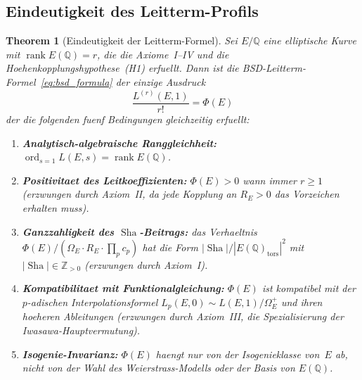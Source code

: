 \documentclass[aps,prd,twocolumn,superscriptaddress,nofootinbib]{revtex4-2}
\newtheorem{theorem}{Theorem}[section]
\theoremstyle{definition}
\theoremstyle{remark}
\DeclareMathOperator{\ord}{ord}
\DeclareMathOperator{\rank}{rank}
\DeclareMathOperator{\Sha}{Sha}
\begin{document}
\subsection{Eindeutigkeit des Leitterm-Profils}

\begin{theorem}[Eindeutigkeit der Leitterm-Formel]
\label{thm:uniqueness}
Sei $E/\mathbb{Q}$ eine elliptische Kurve mit $\rank E(\mathbb{Q}) = r$, die die Axiome~I--IV und die Hoehenkopplungshypothese~(H1) erfuellt. Dann ist die BSD-Leitterm-Formel~\eqref{eq:bsd_formula} der \textit{einzige} Ausdruck
\[
  \frac{L^{(r)}(E,1)}{r!} = \Phi(E)
\]
der die folgenden fuenf Bedingungen gleichzeitig erfuellt:
\begin{enumerate}
  \item[\textbf{(U1)}] \textbf{Analytisch-algebraische Ranggleichheit:} $\ord_{s=1} L(E,s) = \rank E(\mathbb{Q})$.
  \item[\textbf{(U2)}] \textbf{Positivitaet des Leitkoeffizienten:} $\Phi(E) > 0$ wann immer $r \geq 1$ (erzwungen durch Axiom~II, da jede Kopplung an $R_E > 0$ das Vorzeichen erhalten muss).
  \item[\textbf{(U3)}] \textbf{Ganzzahligkeit des $\Sha$-Beitrags:} das Verhaeltnis $\Phi(E)/(\Omega_E \cdot R_E \cdot \prod_p c_p)$ hat die Form $|\Sha|/|E(\mathbb{Q})_{\mathrm{tors}}|^2$ mit $|\Sha| \in \mathbb{Z}_{>0}$ (erzwungen durch Axiom~I).
  \item[\textbf{(U4)}] \textbf{Kompatibilitaet mit Funktionalgleichung:} $\Phi(E)$ ist kompatibel mit der $p$-adischen Interpolationsformel $L_p(E,0) \sim L(E,1)/\Omega_E^+$ und ihren hoeheren Ableitungen (erzwungen durch Axiom~III, die Spezialisierung der Iwasawa-Hauptvermutung).
  \item[\textbf{(U5)}] \textbf{Isogenie-Invarianz:} $\Phi(E)$ haengt nur von der Isogenieklasse von~$E$ ab, nicht von der Wahl des Weierstrass-Modells oder der Basis von $E(\mathbb{Q})$.
\end{enumerate}
\end{theorem}
\end{document}
